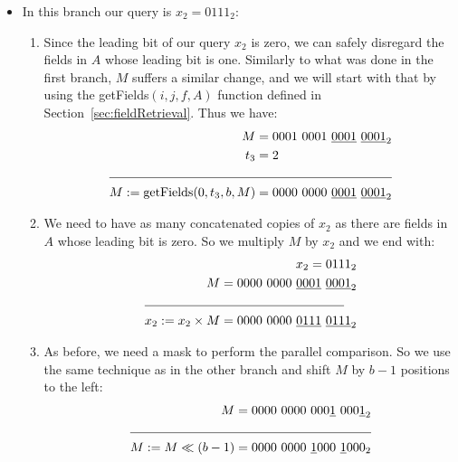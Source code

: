\begin{itemize}
\begin{enumerate}
    \end{enumerate}
    \item
    In this branch our query is $x_2 = 0111_2$:
    \begin{enumerate}
        \item
        Since the leading bit of our query $x_2$ is zero, we can safely disregard the fields in $A$ whose leading bit is one. Similarly to what was done in the first branch, $M$ suffers a similar change, and we will start with that by using the getFields$(i, j, f, A)$ function defined in Section~\ref{sec:fieldRetrieval}. Thus we have:
        \begin{align*}
            M &= 0001\ 0001\ \underline{0001}\ \underline{0001}_2 \\
            t_3 &= 2 \\
            \cline{1-2}
            M := \text{getFields}(0, t_3, b, M) &= 0000\ 0000\ \underline{0001}\ \underline{0001}_2 \\
        \end{align*}
        
        \item
        We need to have as many concatenated copies of $x_2$ as there are fields in $A$ whose leading bit is zero. So we multiply $M$ by $x_2$ and we end with:
        \begin{align*}
            x_2 = 0111_2 \\
            M = 0000\ 0000\ \underline{0001}\ \underline{0001}_2 \\
            \cline{1-2}
            x_2 := x_2 \times M = 0000\ 0000\ \underline{0111}\ \underline{0111}_2 \\
        \end{align*}
        
        \item
        As before, we need a mask to perform the parallel comparison. So we use the same technique as in the other branch and shift $M$ by $b-1$ positions to the left:
        \begin{align*}
            M = 0000\ 0000\ 000\underline{1}\ 000\underline{1}_2& \\
            \cline{1-2}
            M := M \ll (b - 1) = 0000\ 0000\ \underline{1}000\ \underline{1}000_2& \\
        \end{align*}
        

\end{enumerate}
\end{itemize}
